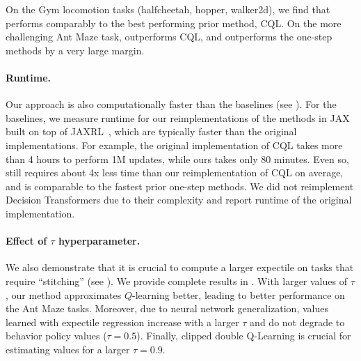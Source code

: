 %
On the Gym locomotion tasks (halfcheetah, hopper, walker2d), we find that \ourname performs comparably to the best performing prior method, CQL. On the more challenging Ant Maze task, \ourname outperforms CQL, and outperforms the one-step methods by a very large margin.


\vspace{-0.15in}
\paragraph{Runtime.} Our approach is also computationally faster than the baselines (see ). For the baselines, we measure runtime for our reimplementations of the methods in JAX~\citep{jax2018github} built on top of JAXRL~\citep{jaxrl}, which are typically faster than the original implementations. For example, the original implementation of CQL takes more than 4 hours to perform 1M updates, while ours takes only 80 minutes. Even so, \ourname still requires about 4x less time than our reimplementation of CQL on average, and is comparable to the fastest prior one-step methods. We did not reimplement Decision Transformers due to their complexity and report runtime of the original implementation.


\vspace{-0.1in}
\paragraph{Effect of $\tau$ hyperparameter.} We also demonstrate that it is crucial to compute a larger expectile on tasks that require ``stitching'' (see ). We provide complete results in .
With larger values of $\tau$, our method approximates $Q$-learning better, leading to better performance on the Ant Maze tasks. Moreover, due to neural network generalization, values learned with expectile regression increase with a larger $\tau$ and do not degrade to behavior policy values ($\tau=0.5$). Finally, clipped double Q-Learning is crucial for estimating values for a larger $\tau=0.9$.

